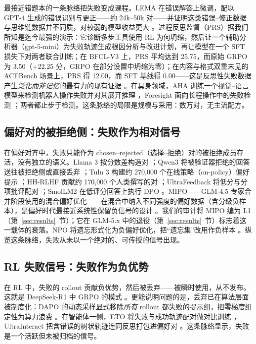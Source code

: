 \documentclass[10pt,fontset=fandol]{ctexart}
\begin{document}
最接近错题本的一条脉络把失败变成课程。LEMA 在错误解答上微调，配以 GPT-4 生成的错误识别与更正——约 24k--50k 对——并证明这类错误--修正数据与思维链数据并不同质，对较弱的模型收益更大 \cite{an2023lema}。过程反思监督（PRS）据我们所知是迄今最强的演示：它诊断多步工具使用 RL 为何坍缩，然后让一个辅助分析器（gpt-5-mini）为失败轨迹生成根因分析与改进计划，再让模型在一个 SFT 损失下对两者联合训练；在 BFCL-V3 上，PRS 平均达到 25.75，而原始 GRPO 为 3.50（$+22.25$ 分，GRPO 在部分设置中坍缩为零）；在内容与格式双重未见的 ACEBench 场景上，PRS 得 12.00，而 SFT 基线得 0.00——这是反思性失败数据产生\emph{泛化而非记忆}的最有力的现有证据 \cite{hao2026prs}。在具身领域，AHA 训练一个视觉--语言模型来检测机器人操作失败并对其展开推理 \cite{duan2024aha}，Foresight 面向长程操作中的失败检测 \cite{zhang2026foresight}；两者都止步于检测。这条脉络的局限是规模与采用：数万对，无主流配方。

\subsection{偏好对的被拒绝侧：失败作为相对信号}

在偏好对齐中，失败只能作为 chosen--rejected（选择--拒绝）对的被拒绝成员存活，没有独立的语义。Llama 3 按分数差构造对 \cite{grattafiori2024llama3}；Qwen3 将被验证器拒绝的回答送往被拒绝侧或直接丢弃 \cite{qwen2025qwen3}；Tulu 3 构建约 270,000 个在线策略（on-policy）偏好提示 \cite{lambert2025tulu3}；HH-RLHF 贡献约 170,000 个人类撰写的对 \cite{anthropic2022hhrlhf}；UltraFeedback 将低分与分项批评配对 \cite{openbmb2023ultrafeedback}；SmolLM2 在低评分回答上执行 DPO \cite{hftb2024smoltalk}。MIPO——GLM-4.5 专家合并阶段使用的混合偏好优化——在混合中纳入不同强度的偏好数据（含分级负样本），是偏好时代最接近系统性保留负信号的设计 \cite{zai2025glm45}。我们的审计将 MIPO 编为 L1（第~\ref{sec:results}~节）；它在 GLM-5.x 中的退役（第~\ref{sec:results}~节）标志着这一载体的衰落。NPO 将遗忘形式化为负偏好优化，把“遗忘集”改用作负样本 \cite{zhang2024npo}。纵览这条脉络，失败从未以一个绝对的、可传授的信号出现。

\subsection{RL 失败信号：失败作为负优势}

在 RL 中，失败的 rollout 贡献负优势，然后被丢弃——被瞬时使用，从不发布。这就是 DeepSeek-R1 中 GRPO 的模式 \cite{deepseek2025r1}。更能说明问题的是，丢弃已在算法层面被制度化：DAPO 的动态采样显式移除\emph{所有} rollout 都失败的提示组，把零梯度组定性为算力浪费 \cite{yu2025dapo}。在智能体一侧，ETO 将失败与成功轨迹配对做对比训练 \cite{song2024eto}，UltraInteract 把含错误的树状轨迹连同反思打包进偏好对 \cite{yuan2024ultrainteract}。这条脉络显示，失败是一个活跃但未被归档的信号。
\end{document}
